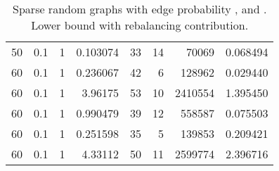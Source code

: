 \documentclass[a4paper,11pt]{article}
\begin{document}
\begin{table}
\begin{center}
\begin{tabular}{|rrr|r|r|rr|r|}
50 & 0.1 & 1 & 0.103074 & 33 & 14 & 70069 & 0.068494 \\
60 & 0.1 & 1 & 0.236067 & 42 & 6 & 128962 & 0.029440 \\
60 & 0.1 & 1 & 3.96175 & 53 & 10 & 2410554 & 1.395450 \\
60 & 0.1 & 1 & 0.990479 & 39 & 12 & 558587 & 0.075503 \\
60 & 0.1 & 1 & 0.251598 & 35 & 5 & 139853 & 0.209421 \\
60 & 0.1 & 1 & 4.33112 & 50 & 11 & 2599774 & 2.396716 \\
\hline
\end{tabular}
\end{center}
\caption{Sparse random graphs with edge probability ,
   and . Lower bound with rebalancing contribution.}
\label{tab:sparse-rebal}
\end{table}
\end{document}
